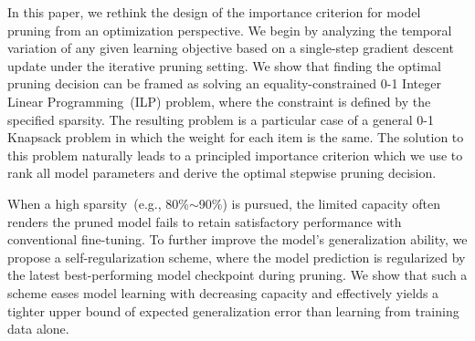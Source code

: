 






In this paper, we rethink the design of the importance criterion for model pruning from an optimization perspective. We begin by analyzing the temporal variation of any given learning objective based on a single-step gradient descent update under the iterative pruning setting. We show that finding the optimal pruning decision can be framed as solving an equality-constrained 0-1 Integer Linear Programming~(ILP) problem, where the constraint is defined by the specified sparsity. The resulting problem is a particular case of a general 0-1 Knapsack problem in which the weight for each item is the same. The solution to this problem naturally leads to a principled importance criterion which we use to rank all model parameters and derive the optimal stepwise pruning decision.



When a high sparsity~(e.g., 80\%$\sim$90\%) is pursued, the limited capacity often renders the pruned model fails to retain satisfactory performance with conventional fine-tuning. To further improve the model's generalization ability, we propose a self-regularization scheme, where the model prediction is regularized by the latest best-performing model checkpoint during pruning. We show that such a scheme eases model learning with decreasing capacity and effectively yields a tighter upper bound of expected generalization error than learning from training data alone.



